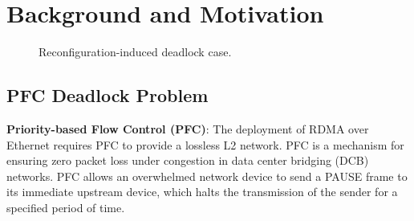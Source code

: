 \section{Background and Motivation}\label{sec:background}

\begin{figure}[t]
	\centering
	
	
	\caption{Reconfiguration-induced deadlock case.}\label{fig:treecase}
	
\end{figure}

\subsection{PFC Deadlock Problem}\label{subsec:pfcdeadlock}


\textbf{Priority-based Flow Control (PFC)}: The deployment of RDMA over Ethernet requires PFC  to provide a lossless L2 network. PFC is a mechanism for ensuring zero packet loss under congestion in data center bridging (DCB) networks. PFC allows an overwhelmed network device to send a PAUSE frame to its immediate upstream device, which halts the transmission of the sender for a specified period of time.  

